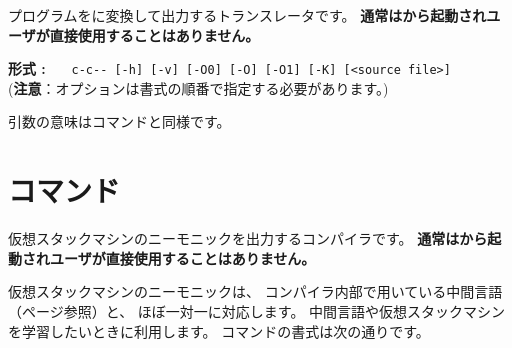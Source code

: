 {\cmm}プログラムを{\cl}に変換して出力するトランスレータです。
{\bf 通常は{\cmc}から起動されユーザが直接使用することはありません。}

\begin{flushleft}
{\bf 形式 : }~~~\verb/c-c-- [-h] [-v] [-O0] [-O] [-O1] [-K] [<source file>]/\\
({\bf 注意}：オプションは書式の順番で指定する必要があります。)
\end{flushleft}


引数の意味は{\cmmc}コマンドと同様です。




\section{{\vcmmc}コマンド}
\label{command:vcmmc}

仮想スタックマシンのニーモニックを出力する{\cmm}コンパイラです。
{\bf 通常は{\cmv}から起動されユーザが直接使用することはありません。}

仮想スタックマシンのニーモニックは、
コンパイラ内部で用いている中間言語（\pageref{app:vm}ページ参照）と、
ほぼ一対一に対応します。
中間言語や仮想スタックマシンを学習したいときに利用します。
{\vcmmc}コマンドの書式は次の通りです。

